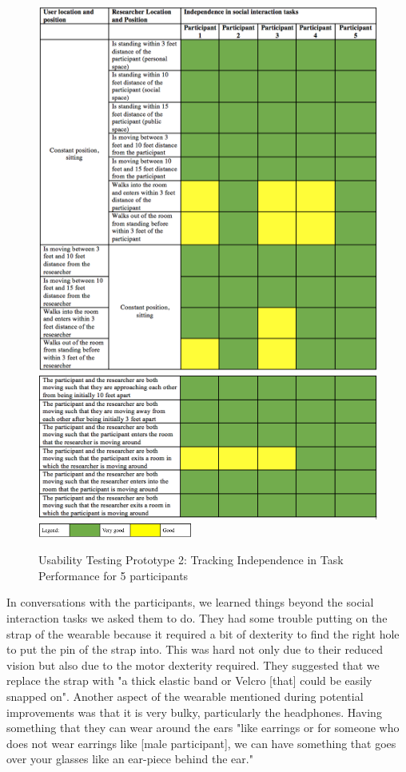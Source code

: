 \begin{figure}[!htbp]
  \centering
  \includegraphics[width=\columnwidth]{figures/usability1.png}
  \includegraphics[width=\columnwidth]{figures/usability2.png}
  \includegraphics[width=2in]{figures/Legend.png}
  \caption{Usability Testing Prototype 2: Tracking Independence in Task Performance for 5 participants}
  \label{fig:usability}
\end{figure}

In conversations with the participants, we learned things beyond the social interaction tasks we asked them to do. 
They had some trouble putting on the strap of the wearable because it required a bit of dexterity to find the right hole to put the pin of the strap into. This was hard not only due to their reduced vision but also due to the motor dexterity required. They suggested that we replace the strap with "a thick elastic band or Velcro [that] could be easily snapped on". Another aspect of the wearable mentioned during potential improvements was that it is very bulky, particularly the headphones. Having something that they can wear around the ears "like earrings or for someone who does not wear earrings like [male participant], we can have something that goes over your glasses like an ear-piece behind the ear."
 
